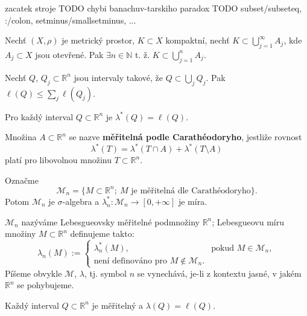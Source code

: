 zacatek stroje
TODO chybi  banachuv-tarskiho paradox
TODO subset/subseteq, :/colon, setminus/smallsetminus, ...

\begin{lemma}
Nechť $(X, \rho)$ je metrický prostor, $K \subset X$ kompaktní, nechť
$K \subset \bigcup_{j=1}^\infty A_j$, kde $A_j \subset X$ jsou otevřené.
Pak $\exists n \in \mathbb{N}$ t. ž.
$K \subset \bigcup_{j=1}^n A_j$.
\end{lemma}

\begin{lemma}[*]
Nechť $Q$, $Q_j \subset \mathbb{R}^n$ jsou intervaly takové, že
$Q \subset \bigcup_j Q_j$. Pak $\ell(Q) \le \sum_j \ell(Q_j)$.
\end{lemma}

\begin{dusledek}
Pro každý interval $Q \subset \mathbb{R}^n$ je $\lambda^*(Q) = \ell(Q)$.
\end{dusledek}

\begin{definice}
Množina $A \subset \mathbb{R}^n$ se nazve \textbf{měřitelná podle
Carathéodoryho}, jestliže rovnost
\[
\lambda^*(T) = \lambda^*(T \cap A) + \lambda^*(T \setminus A)
\]
platí pro libovolnou  množinu $T \subset \mathbb{R}^n$.
\end{definice}

\begin{veta}[Carathéodoryho]
Označme
\[
\mathcal{M}_n = \{M \subset \mathbb{R}^n; \ M \text{ je měřitelná dle
Carathéodoryho}\}.
\]
Potom $\mathcal{M}_n$ je $\sigma$-algebra a
$\lambda_n^* : \mathcal{M}_n \to [0, +\infty]$ je míra.
\end{veta}

\begin{poznamka}
$\mathcal{M}_n$ nazýváme Lebesgueovsky měřitelné podmnožiny
$\mathbb{R}^n$; Lebesgueovu míru množiny $M \subset \mathbb{R}^n$
definujeme takto:
\[
\lambda_n(M) := \begin{cases}
\lambda_n^*(M), & \text{pokud } M \in \mathcal{M}_n, \\
\text{není definováno pro } M \notin \mathcal{M}_n.
\end{cases}
\]
Píšeme obvykle $\mathcal{M}$, $\lambda$, tj. symbol $n$ se vynechává,
je-li z kontextu jasné, v jakém $\mathbb{R}^n$ se pohybujeme.
\end{poznamka}

\begin{lemma}
Každý interval $Q \subset \mathbb{R}^n$ je měřitelný a
$\lambda(Q) = \ell(Q)$.
\end{lemma}

